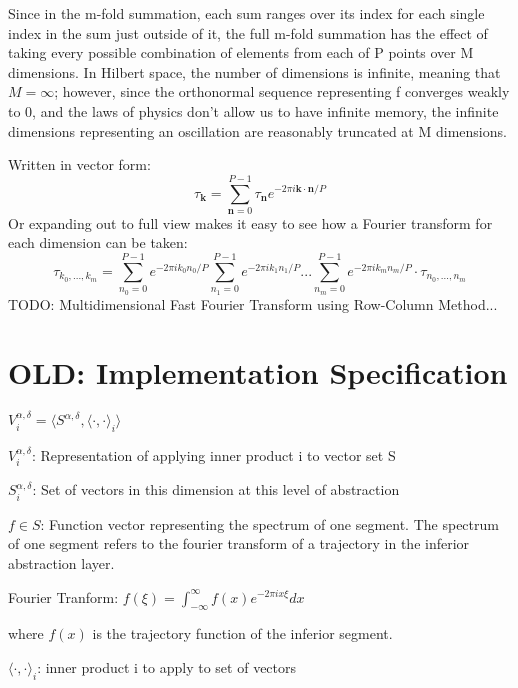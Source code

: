 \documentclass{article}
\begin{document}
Since in the m-fold summation, each sum ranges over its index for each single index in the sum just outside of it, the full m-fold summation has the effect of taking every possible combination of elements from each of P points over M dimensions.  In Hilbert space, the number of dimensions is infinite, meaning that $M = \infty$; however, since the orthonormal sequence representing f converges weakly to 0, and the laws of physics don't allow us to have infinite memory, the infinite dimensions representing an oscillation are reasonably truncated at M dimensions.

Written in vector form:
\begin{equation}
  \tau_{\bm{k}} = \sum_{\bm{n}=0}^{P-1} \tau_{\bm{n}} e^{-2 \pi i \bm{k} \cdot \bm{n} / P}
\end{equation}
Or expanding out to full view makes it easy to see how a Fourier transform for each dimension can be taken:
\begin{equation}
  \tau_{k_0, ..., k_m} = 
    \sum_{n_0=0}^{P-1} e^{-2 \pi i k_0 n_0 / P} 
    \sum_{n_1=0}^{P-1} e^{-2 \pi i k_1 n_1 / P} 
    ...
    \sum_{n_m=0}^{P-1} e^{-2 \pi i k_m n_m / P} \cdot \tau_{n_0, ..., n_m} 
\end{equation}
TODO: Multidimensional Fast Fourier Transform using Row-Column Method...


\section{OLD: Implementation Specification}

$V_i^{\alpha , \delta} = \langle S^{\alpha, \delta}, \langle \cdot , \cdot \rangle_i \rangle$

$V_i^{\alpha , \delta}$: Representation of applying inner product i to vector set S

$S_i^{\alpha , \delta}$: Set of vectors in this dimension at this level of abstraction

$f \in S$: Function vector representing the spectrum of one segment.
The spectrum of one segment refers to the fourier transform of a trajectory in the inferior abstraction layer.

Fourier Tranform: $f(\xi) = \int_{-\infty}^\infty f(x) e^{-2 \pi i x \xi} dx$

where $f(x)$ is the trajectory function of the inferior segment.

$\langle \cdot , \cdot \rangle_i$: inner product i to apply to set of vectors
\end{document}
